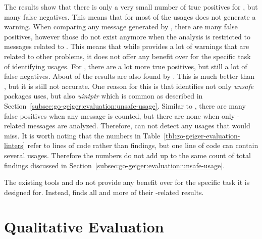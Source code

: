 

The results show that there is only a very small number of true positives for \toolVet{}, but many false negatives.
This means that for most of the \unsafe{} usages \toolVet{} does not generate a warning.
When comparing any message generated by \toolVet{}, there are many false positives, however those do not exist anymore
when the analysis is restricted to \toolVet{} messages related to \unsafe{}.
This means that while \toolVet{} provides a lot of warnings that are related to other problems, it does not offer any
benefit over \toolGeiger{} for the specific task of identifying \unsafe{} usages.
For \toolGosec{}, there are a lot more true positives, but still a lot of false negatives.
About  of the \toolGeiger{} results are also found by \toolGosec{}.
This is much better than \toolVet{}, but it is still not accurate.
One reason for this is that \toolGeiger{} identifies not only \textit{unsafe} packages uses, but also \textit{uintptr}
which is common as described in Section~\ref{subsec:go-geiger:evaluation:unsafe-usage}.
Similar to \toolVet{}, there are many false positives when any \toolGosec{} message is counted, but there are none when
only \unsafe{}-related messages are analyzed.
Therefore, \toolGosec{} can not detect any usages that \toolGeiger{} would miss.
It is worth noting that the numbers in Table~\ref{tbl:go-geiger-evaluation-linters} refer to lines of code rather than
\unsafe{} findings, but one line of code can contain several \unsafe{} usages.
Therefore the numbers do not add up to the same count of total findings discussed in
Section~\ref{subsec:go-geiger:evaluation:unsafe-usage}.

\begin{answerToRQ}[\ref{rq:linterComparison}]
    The existing tools \toolVet{} and \toolGosec{} do not provide any benefit over \toolGeiger{} for the specific task
    it is designed for.
    Instead, \toolGeiger{} finds all and more of their \unsafe{}-related results.
\end{answerToRQ}



\section{Qualitative Evaluation}\label{sec:go-geiger:qualitative-evaluation}

